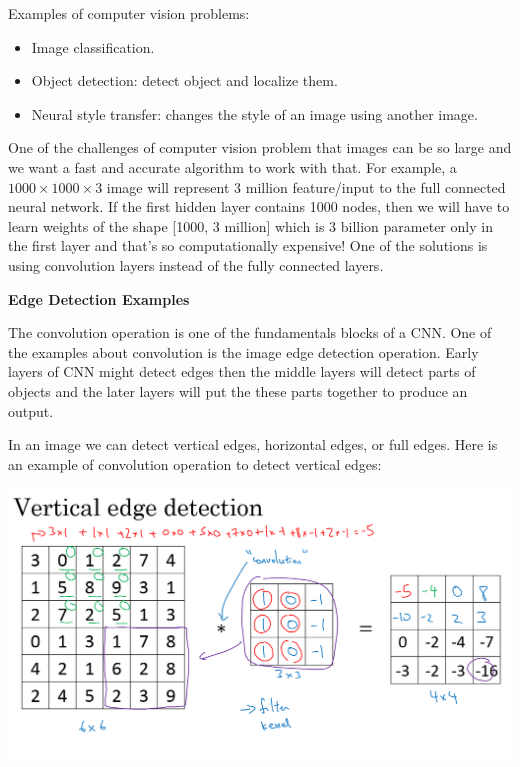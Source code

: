 \documentclass{article}
\begin{document}
\bigskip

\noindent Examples of computer vision problems:

\begin{itemize}
    \item Image classification.
    \item Object detection: detect object and localize them.
    \item Neural style transfer: changes the style of an image using another image.
\end{itemize}

\noindent One of the challenges of computer vision problem that images can be so large and we want a fast and accurate algorithm to work with that. For example, a \(1000 \times 1000 \times 3\) image will represent 3 million feature/input to the full connected neural network. If the first hidden layer contains 1000 nodes, then we will have to learn weights of the shape [1000, 3 million] which is 3 billion parameter only in the first layer and that's so computationally expensive! One of the solutions is using convolution layers instead of the fully connected layers.

\bigskip

\noindent \textbf{Edge Detection Examples}

\noindent The convolution operation is one of the fundamentals blocks of a CNN. One of the examples about convolution is the image edge detection operation. Early layers of CNN might detect edges then the middle layers will detect parts of objects and the later layers will put the these parts together to produce an output.

\bigskip

\noindent In an image we can detect vertical edges, horizontal edges, or full edges. Here is an example of convolution operation to detect vertical edges:

\begin{center}
\includegraphics[scale=0.3]{./images/edge_detection.png}
\end{center}
\end{document}
